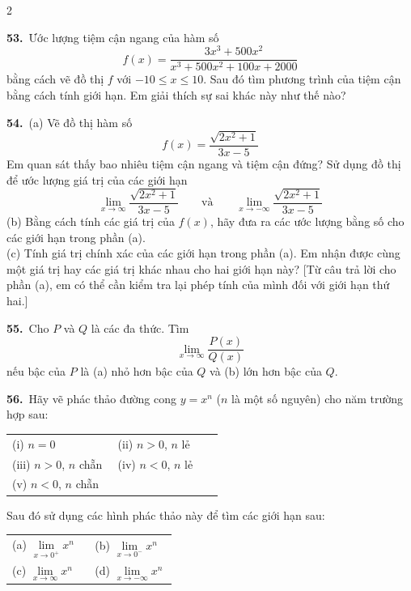\fontsize{9pt}{11.8pt}\selectfont

\begin{multicols}{2}

\marginicon\textbf{53.}\ Ước lượng tiệm cận ngang của hàm số
\[
f(x) = \frac{3x^3 + 500x^2}{x^3 + 500x^2 + 100x + 2000}
\]
bằng cách vẽ đồ thị $f$ với $-10 \le x \le 10$. Sau đó tìm phương trình của tiệm cận bằng cách tính giới hạn. Em giải thích sự sai khác này như thế nào?

\vspace{6pt}
\marginicon\textbf{54.}\ (a) Vẽ đồ thị hàm số
\[
f(x) = \frac{\sqrt{2x^2 + 1}}{3x - 5}
\]
Em quan sát thấy bao nhiêu tiệm cận ngang và tiệm cận đứng? Sử dụng đồ thị để ước lượng giá trị của các giới hạn
\[
\lim_{x \to \infty} \frac{\sqrt{2x^2 + 1}}{3x - 5} \qquad\text{và}\qquad \lim_{x \to -\infty} \frac{\sqrt{2x^2 + 1}}{3x - 5}
\]
(b) Bằng cách tính các giá trị của $f(x)$, hãy đưa ra các ước lượng bằng số cho các giới hạn trong phần (a).\\
(c) Tính giá trị chính xác của các giới hạn trong phần (a). Em nhận được cùng một giá trị hay các giá trị khác nhau cho hai giới hạn này? [Từ câu trả lời cho phần (a), em có thể cần kiểm tra lại phép tính của mình đối với giới hạn thứ hai.]

\vspace{6pt}
\textbf{55.}\ Cho $P$ và $Q$ là các đa thức. Tìm
\[
\lim_{x \to \infty} \frac{P(x)}{Q(x)}
\]
nếu bậc của $P$ là (a) nhỏ hơn bậc của $Q$ và (b) lớn hơn bậc của $Q$.

\vspace{6pt}
\textbf{56.}\ Hãy vẽ phác thảo đường cong $y = x^n$ ($n$ là một số nguyên) cho năm trường hợp sau:
\begin{center}
\begin{tabular}{@{}p{0.48\linewidth}p{0.48\linewidth}@{}}
(i) $n = 0$ & (ii) $n > 0$, $n$ lẻ \\
(iii) $n > 0$, $n$ chẵn & (iv) $n < 0$, $n$ lẻ \\
(v) $n < 0$, $n$ chẵn &
\end{tabular}
\end{center}
Sau đó sử dụng các hình phác thảo này để tìm các giới hạn sau:
\begin{center}
\begin{tabular}{@{}p{0.48\linewidth}p{0.48\linewidth}@{}}
(a) $\lim\limits_{x \to 0^+} x^n$ & (b) $\lim\limits_{x \to 0^-} x^n$ \\[6pt]
(c) $\lim\limits_{x \to \infty} x^n$ & (d) $\lim\limits_{x \to -\infty} x^n$
\end{tabular}
\end{center}


\end{multicols}
